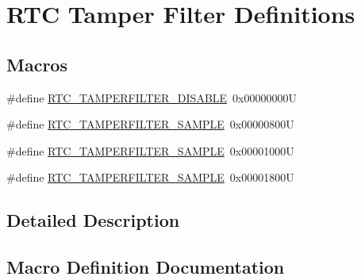 \hypertarget{group___r_t_c_ex___tamper___filter___definitions}{}\section{R\+TC Tamper Filter Definitions}
\label{group___r_t_c_ex___tamper___filter___definitions}
\subsection*{Macros}
\begin{DoxyCompactItemize}
\item 
\#define \hyperlink{group___r_t_c_ex___tamper___filter___definitions_ga0809aebfef5642f8f2a8d04b0aed4d98}{R\+T\+C\+\_\+\+T\+A\+M\+P\+E\+R\+F\+I\+L\+T\+E\+R\+\_\+\+D\+I\+S\+A\+B\+LE}~0x00000000U
\item 
\#define \hyperlink{group___r_t_c_ex___tamper___filter___definitions_ga4338b957d061fa9d1d51d403275fe391}{R\+T\+C\+\_\+\+T\+A\+M\+P\+E\+R\+F\+I\+L\+T\+E\+R\+\_\+S\+A\+M\+P\+LE}~0x00000800U
\item 
\#define \hyperlink{group___r_t_c_ex___tamper___filter___definitions_gabd9f9f1c669c073d58bd71257faa079e}{R\+T\+C\+\_\+\+T\+A\+M\+P\+E\+R\+F\+I\+L\+T\+E\+R\+\_\+S\+A\+M\+P\+LE}~0x00001000U
\item 
\#define \hyperlink{group___r_t_c_ex___tamper___filter___definitions_ga3689ed6d70107f0acc92aae8b13600bd}{R\+T\+C\+\_\+\+T\+A\+M\+P\+E\+R\+F\+I\+L\+T\+E\+R\+\_\+S\+A\+M\+P\+LE}~0x00001800U
\end{DoxyCompactItemize}


\subsection{Detailed Description}


\subsection{Macro Definition Documentation}
\mbox{\label{group___r_t_c_ex___tamper___filter___definitions_ga4338b957d061fa9d1d51d403275fe391}} 
